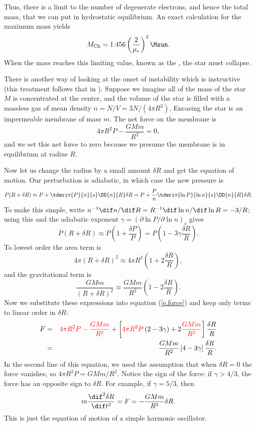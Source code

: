 Thus, there is a limit to the number of degenerate electrons, and hence the total mass, that we can put in hydrostatic equilibrium.  An exact calculation for the maximum mass yields
\begin{equation}\label{e.Chandrasekhar}
	M_{\mathrm{Ch}} = 1.456 \left(\frac{2}{\mu_{e}}\right)^{2}\Msun.
\end{equation}
When the mass reaches this limiting value, known as the , the star must collapse.

\begin{sidebar}
There is another way of looking at the onset of instability which is instructive (this treatment follows that in \citet{Cox1980Theory-of-Stell}). Suppose we imagine all of the mass of the star $M$ is concentrated at the center, and the volume of the star is filled with a massless gas of mean density $n = N/V = 3N/(4\pi R^{3})$. Encasing the star is an impermeable membrane of mass $m$.  The net force on the membrane is
\begin{equation}\label{e.force}
	4\pi R^{2} P - \frac{GMm}{R^{2}} = 0,
\end{equation}
and we set this net force to zero because we presume the membrane is in equilibrium at radius $R$.

Now let us change the radius by a small amount $\delta R$ and get the equation of motion. Our perturbation is adiabatic, in which case the new pressure is
\[ 
	P(R+\delta R) \approx P + \tderiv{P}{n}{s}\DD{n}{R}\delta R 
	= P + \frac{P}{n}\tderiv{\ln P}{\ln n}{s} \DD{n}{R}\delta R. 
\]
To make this simple, write $n^{-1}\dif n/\dif R = R^{-1}\dif\ln n/\dif\ln R = -3/R$; using this and the adiabatic exponent $\gamma = (\partial\ln P/\partial\ln n)_{s}$ gives
\[
	P(R+\delta R) \approx P\left(1 + \frac{\delta P}{P}\right) 
	= P\left(1 - 3\gamma \frac{\delta R}{R}\right).
\]
To lowest order the area term is
\[ 4\pi (R+\delta R)^{2} \approx 4\pi R^{2}\left(1 + 2\frac{\delta R}{R}\right), \]
and the gravitational term is
\[
	\frac{GMm}{(R+\delta R)^{2}} \approx \frac{GMm}{R^{2}}\left(1-2\frac{\delta R}{R}\right).
\]
Now we substitute these expressions into equation (\ref{e.force}) and keep only terms to linear order in $\delta R$:
\begin{eqnarray}
	F &=& \color{red} 4\pi R^{2} P - \frac{GMm}{R^{2}}
	\color{black} + \left[{\color{red}4\pi R^{2}P}\left( 2 - 3\gamma \right) + 2 {\color{red}\frac{GMm}{R^{2}}} \right ] \frac{\delta R}{R} \nonumber\\
	&=& \frac{GMm}{R^{2}} \left[4 - 3\gamma\right]\frac{\delta R}{R}.
\end{eqnarray}
In the second line of this equation, we used the assumption that when $\delta R = 0$ the force vanishes, so $4\pi R^{2}P = GMm/R^{2}$.  Notice the sign of the force: if $\gamma > 4/3$, the force has an opposite sign to $\delta R$. For example, if $\gamma = 5/3$, then 
\begin{equation}\label{e.SHO}
	m\frac{\dif^{2}\delta R}{\dif t^{2}} = F  = - \frac{GMm}{R^{3}}\delta R.
\end{equation}
This is just the equation of motion of a simple harmonic oscillator.


\end{sidebar}
